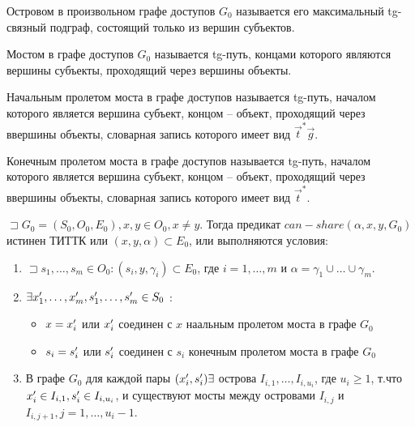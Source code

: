 \begin{defs}[Остров]
	Островом в произвольном графе доступов $G_0$ называется его максимальный tg-связный подграф, состоящий только из вершин субъектов.
\end{defs}

\begin{defs}[Мост]
	Мостом в графе доступов $G_0$ называется tg-путь, концами которого являются вершины субъекты, проходящий через вершины объекты.
\end{defs}

\begin{defs}
	Начальным пролетом моста в графе доступов называется tg-путь, началом которого является вершина субъект, концом -- объект, проходящий через ввершины объекты, словарная запись которого имеет вид 
	 $ \overrightarrow{t}^* \overrightarrow{g} $.
\end{defs}

\begin{defs}
	Конечным пролетом моста в графе доступов называется tg-путь, началом которого является вершина субъект, концом -- объект, проходящий через ввершины объекты, словарная запись которого имеет вид
	$\overrightarrow{t}^*$.
\end{defs}

\begin{proofs}
	$\sqsupset  G_0 = (S_0, O_0, E_0), x,y \in O_0, x \neq y$. Тогда предикат $can-share(\alpha, x, y, G_0)$
	истинен ТИТТК или $(x, y, \alpha ) \subset E_0$, или выполняются условия:
	\begin{enumerate}
		\item $ \sqsupset s_1, \ldots, s_m \in O_0 : (s_i, y, \gamma_i) \subset E_0 $, где 
		$ i = 1, \ldots, m $ и $ \alpha = \gamma_1 \cup \ldots \cup \gamma_m $.
		\item $ \exists x_1^{\prime}, \ldots, x_m^{\prime}, s_1^{\prime}, \ldots, s_m^{\prime} \in S_0$ :		
			\begin{itemize}
				\item $x = x_i^{\prime}$ или $x_i^{\prime}$ соединен с $x$ наальным пролетом моста в графе $G_0$
				\item $s_i = s_i^{\prime}$ или $s_i^{\prime}$ соединен с $s_i$ конечным пролетом моста в графе $G_0$
			\end{itemize}
		\item В графе $G_0$ для каждой пары $(x_i^{\prime}, s_i^{\prime}) \exists $ острова $I_{i,1}, \ldots, I_{i, u_{i}}$, где $u_i \geqslant 1$, т.что 
		$x_i^{\prime} \in I_{i,1}, s_i^{\prime} \in I_{i, u_{i}}$, и существуют мосты между островами $I_{i,j}$ и $I_{i, j+1}, j = 1, \ldots, u_i - 1$.	
	\end{enumerate}
\end{proofs}

